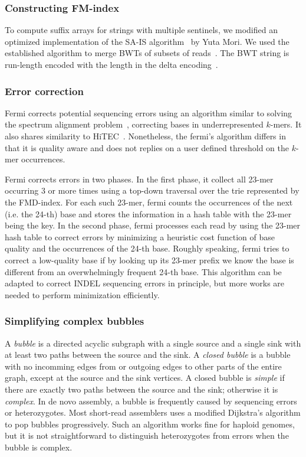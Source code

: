 \documentclass{bioinfo}
\begin{document}
\begin{methods}
\subsubsection{Constructing FM-index}
To compute suffix arrays for strings with multiple sentinels, we modified an
optimized implementation of the SA-IS algorithm~\citep{G.-Nong:2011fk} by Yuta
Mori.  We used the established algorithm to merge BWTs of subsets of
reads~\citep{DBLP:journals/algorithmica/HonLSSY07,en:2009fk,DBLP:conf/latin/FerraginaGM10}.
The BWT string is run-length encoded with the length in the delta
encoding~\citep{Elias:1975ly}.

\subsubsection{Error correction}
Fermi corrects potential sequencing errors using an algorithm similar to
solving the spectrum alignment problem~\citep{Pevzner:2001vn}, correcting
bases in underrepresented $k$-mers. It also shares similarity to
HiTEC~\citep{Ilie:2011fk}. Nonetheless, the fermi's algorithm differs in that
it is quality aware and does not replies on a user defined threshold on the
$k$-mer occurrences.

Fermi corrects errors in two phases. In the first phase, it collect all 23-mer
occurring 3 or more times using a top-down traversal over the trie represented
by the FMD-index. For each such 23-mer, fermi counts the occurrences of
the next (i.e. the 24-th) base and stores the information in a hash table
with the 23-mer being the key. In the second phase, fermi processes each read
by using the 23-mer hash table to correct errors by minimizing a heuristic cost
function of base quality and the occurrences of the 24-th base. Roughly
speaking, fermi tries to correct a low-quality base if by looking up its 23-mer
prefix we know the base is different from an overwhelmingly frequent 24-th base.
This algorithm can be adapted to correct INDEL sequencing errors in principle,
but more works are needed to perform minimization efficiently.

\subsubsection{Simplifying complex bubbles}
A \emph{bubble} is a directed acyclic subgraph with a single source and a
single sink with at least two paths between the source and the sink. A
\emph{closed bubble} is a bubble with no incomming edges from or outgoing edges
to other parts of the entire graph, except at the source and the sink vertices.
A closed bubble is \emph{simple} if there are exactly two paths between the
source and the sink; otherwise it is \emph{complex}.  In de novo assembly, a
bubble is frequently caused by sequencing errors or heterozygotes. Most
short-read assemblers uses a modified Dijkstra's algorithm to pop bubbles
progressively. Such an algorithm works fine for haploid genomes, but it is not
straightforward to distinguish heterozygotes from errors when the bubble is
complex.


\end{methods}
\end{document}
